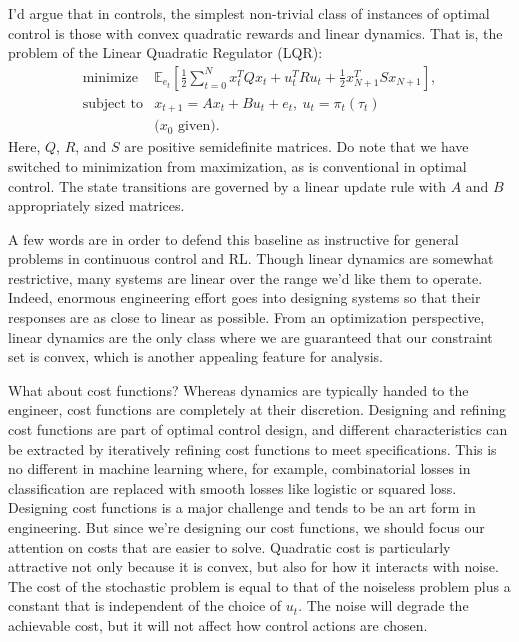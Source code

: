 \documentclass[11pt]{article}
\numberwithin{equation}{section}
\newcommand{\E}{\mathbb{E}}
\begin{document}
I'd argue that in controls, the simplest non-trivial class of instances of optimal control is those with convex quadratic rewards and linear dynamics. That is, the problem of the Linear Quadratic Regulator (LQR):
\begin{equation}\label{eq:lqr-prob}
\begin{array}{ll}
\mbox{minimize} \, & \E_{e_t} \left[\frac{1}{2}\sum_{t=0}^N x_t^TQ x_t + u_t^T R u_t  + \frac{1}{2} x_{N+1}^T S x_{N+1}\right], \\
\mbox{subject to} & x_{t+1} = A x_t+ B u_t +e_t,~u_t=\pi_t(\tau_t) \\
& \mbox{($x_0$ given).}
\end{array}
\end{equation}
Here, $Q$, $R$, and $S$ are positive semidefinite matrices. Do note that we have switched to minimization from maximization, as is conventional in optimal control. The state transitions are governed by a linear update rule with $A$ and $B$ appropriately sized matrices.

A few words are in order to defend this baseline as instructive for general problems in continuous control and RL. Though linear dynamics are somewhat restrictive, many systems are linear over the range we'd like them to operate. Indeed, enormous engineering effort goes into designing systems so that their responses are as close to linear as possible. From an optimization perspective, linear dynamics are the only class where we are guaranteed that our constraint set is convex, which is another appealing feature for analysis.

What about cost functions? Whereas dynamics are typically handed to the engineer, cost functions are completely at their discretion. Designing and refining cost functions are part of optimal control design, and different characteristics can be extracted by iteratively refining cost functions to meet specifications. This is no different in machine learning where, for example, combinatorial losses in classification are replaced with smooth losses like logistic or squared loss. Designing cost functions is a major challenge and tends to be an art form in engineering. But since we're designing our cost functions, we should focus our attention on costs that are easier to solve. Quadratic cost is particularly attractive not only because it is convex, but also for how it interacts with noise. The cost of the stochastic problem is equal to that of the noiseless problem plus a constant that is independent of the choice of $u_t$. The noise will degrade the achievable cost, but it will not affect how control actions are chosen. 
\end{document}
